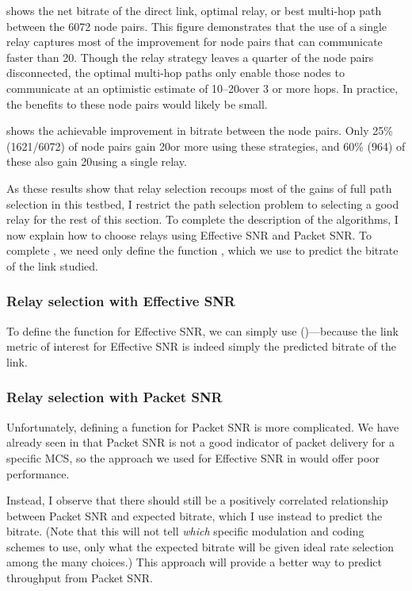  shows the net bitrate of the direct link, optimal relay, or best multi-hop path between the 6072 node pairs. This figure demonstrates that the use of a single relay captures most of the improvement for node pairs that can communicate faster than 20\Mbps. Though the relay strategy leaves a quarter of the node pairs disconnected, the optimal multi-hop paths only enable those nodes to communicate at an optimistic estimate of 10--20\Mbps over 3 or more hops. In practice, the benefits to these node pairs would likely be small.

 shows the achievable improvement in bitrate between the node pairs. Only 25\% (1621/6072) of node pairs gain 20\Mbps or more using these strategies, and 60\% (964) of these also gain 20\Mbps using a single relay.

As these results show that relay selection recoups most of the gains of full path selection in this testbed, I restrict the path selection problem to selecting a good relay for the rest of this section. To complete the description of the algorithms, I now explain how to choose relays using Effective SNR and Packet SNR. To complete , we need only define the function , which we use to predict the bitrate of the link studied.

\subsubsection{Relay selection with Effective SNR}
To define the function  for Effective SNR, we can simply use  ()---because the link metric of interest for Effective SNR is indeed simply the predicted bitrate of the link.

\subsubsection{Relay selection with Packet SNR}
Unfortunately, defining a  function for Packet SNR is more complicated. We have already seen in  that Packet SNR is not a good indicator of packet delivery for a specific MCS, so the approach we used for Effective SNR in  would offer poor performance.

Instead, I observe that there should still be a positively correlated relationship between Packet SNR and expected bitrate, which I use instead to predict the bitrate. (Note that this will not tell \emph{which} specific modulation and coding schemes to use, only what the expected bitrate will be given ideal rate selection among the many choices.) This approach will provide a better way to predict throughput from Packet SNR.

